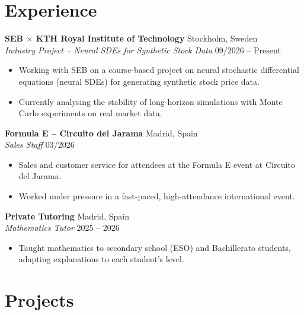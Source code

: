 \documentclass[10pt,a4paper]{article}
\begin{document}
\section{Experience}

\noindent
\textbf{SEB $\times$ KTH Royal Institute of Technology} \hfill Stockholm, Sweden \\
\textit{Industry Project -- Neural SDEs for Synthetic Stock Data} \hfill 09/2026 -- Present
\begin{itemize}
    \item Working with SEB on a course-based project on neural stochastic differential equations (neural SDEs) for generating synthetic stock price data.
    \item Currently analysing the stability of long-horizon simulations with Monte Carlo experiments on real market data.
\end{itemize}

\vspace{5pt}

\noindent
\textbf{Formula E -- Circuito del Jarama} \hfill Madrid, Spain \\
\textit{Sales Staff} \hfill 03/2026
\begin{itemize}
    \item Sales and customer service for attendees at the Formula E event at Circuito del Jarama.
    \item Worked under pressure in a fast-paced, high-attendance international event.
\end{itemize}

\vspace{5pt}

\noindent
\textbf{Private Tutoring} \hfill Madrid, Spain \\
\textit{Mathematics Tutor} \hfill 2025 -- 2026
\begin{itemize}
    \item Taught mathematics to secondary school (ESO) and Bachillerato students, adapting explanations to each student's level.
\end{itemize}

\section{Projects}
\end{document}
